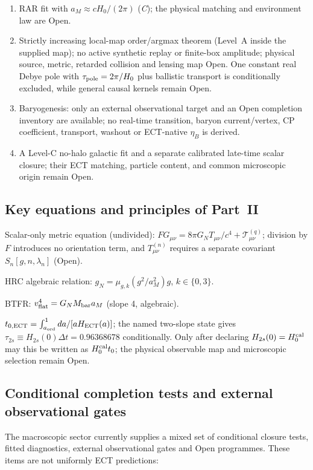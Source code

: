 \documentclass[11pt,a4paper]{article}
\begin{document}
\begin{enumerate}
\item RAR fit with $a_M \approx cH_0/(2\pi)$ (\emph{C}); the physical matching and environment law are Open.
\item Strictly increasing local-map order/argmax theorem (Level~A inside the supplied map); no active synthetic replay or finite-box amplitude; physical source, metric, retarded collision and lensing map Open.  One constant real Debye pole with $\tau_{\rm pole}=2\pi/H_0$ plus ballistic transport is conditionally excluded, while general causal kernels remain Open.
\item Baryogenesis: only an external observational target and an Open
completion inventory are available; no real-time transition, baryon current/vertex,
CP coefficient, transport, washout or ECT-native $\eta_B$ is derived.
\item A Level-C no-halo galactic fit and a separate calibrated late-time scalar closure; their ECT matching, particle content, and common microscopic origin remain Open.
\end{enumerate}

\subsection{Key equations and principles of Part~II}

Scalar-only metric equation (undivided): $F G_{\mu\nu}=8\pi G_N T_{\mu\nu}/c^4+\mathcal T^{(q)}_{\mu\nu}$; division by $F$ introduces no orientation term, and $T^{(n)}_{\mu\nu}$ requires a separate covariant $S_n[g,n,\lambda_n]$ (Open).

HRC algebraic relation: $g_N=\mu_{g,k}(g^2/a_M^2)g$, $k\in\{0,3\}$.

BTFR: $v_{\rm flat}^4 = G_N M_{\rm bar} a_M$ (slope 4, algebraic).

$t_{0,\rm ECT}=\int_{a_{\rm ord}}^1 da/[aH_{\rm ECT}(a)]$; the named two-slope state gives $\tau_{2s}\equiv H_{2s}(0)\Delta t=0.96368678$ conditionally. Only after declaring $H_{2s}(0)=H_0^{\rm cal}$ may this be written as $H_0^{\rm cal}t_0$; the physical observable map and microscopic selection remain Open.

\subsection{Conditional completion tests and external observational gates}

The macroscopic sector currently supplies a mixed set of conditional
closure tests, fitted diagnostics, external observational gates and Open
programmes.  These items are not uniformly ECT predictions:
\end{document}
